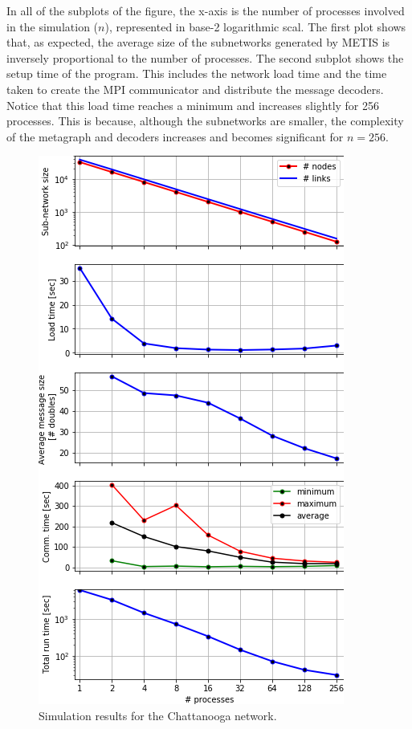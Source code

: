 In all of the subplots of the figure, the x-axis is the number of processes involved in the simulation ($n$), represented in base-2 logarithmic scal. The first plot shows that, as expected, the average size of the subnetworks generated by METIS is inversely proportional to the number of processes. The second subplot shows the setup time of the program. This includes the network load time and the time taken to create the MPI communicator and distribute the message decoders. Notice that this load time reaches a minimum and increases slightly for 256 processes. This is because, although the subnetworks are smaller, the complexity of the metagraph and decoders increases and becomes significant for $n=256$. 
\begin{figure}[!ht]
\centering
\includegraphics[width=\columnwidth]{figs/chattanooga_plots.png}
\caption{Simulation results for the Chattanooga network.}
\label{fig:chattanooga_plots}
\end{figure}

